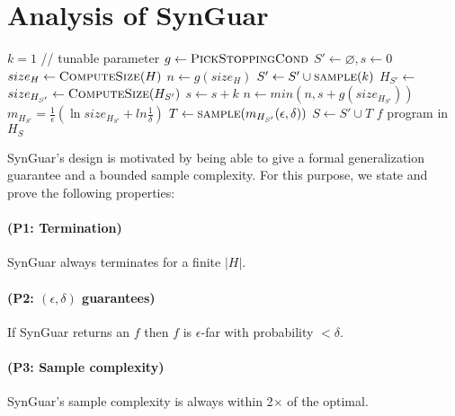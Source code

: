 \documentclass[11pt]{extarticle}
\newcommand{\tool}{{\sc SynGuar}\xspace}
\begin{document}
\section{Analysis of \tool}

\begin{algorithm}[t]
    \caption{\tool Synthesis returns a program with error smaller than $\epsilon$ with probability higher than $1-\delta$}
    \label{alg:main}
    \begin{algorithmic}[1]
      \Procedure{\tool}{$\epsilon, \delta$}
      \State $k = 1$ // tunable parameter
      \State $g \gets \Call{PickStoppingCond}{}$ \label{alg:pick-cond}
      \State $S' \gets \varnothing, s \gets 0$
      \State $size_{H} \gets \Call{ComputeSize}{H}$ \label{alg:call-compute} 
      \State $n \gets g(size_{H})$
      \State $S' \gets S' \cup \Call{sample}{k}$
      \State $H_{S'} \gets $  \label{alg:call-update}
      \State $size_{H_{S'}} \gets \Call{ComputeSize}{H_{S'}}$ \label{alg:call-compute}
      \State $s \gets s + k$
      \State $n \gets min(n, s+g(size_{H_{S'}}))$ \label{alg:min-thresh}
      \EndWhile
      \State $m_{H_{S'}}=\frac{1}{\epsilon}(\ln{size_{H_{S'}}} + ln{\frac{1}{\delta}})$
      \State $T \gets \Call{sample}{m_{H_{S'}}(\epsilon, \delta)}$
      \State $S \gets S'\cup T$ 
      \State \Return $f$ program in $H_S$
      \EndProcedure
    \end{algorithmic}
\end{algorithm}

\tool's design is motivated by being able to give a formal generalization guarantee and a bounded sample complexity. For this purpose, we state and prove the following properties: 

\paragraph{(P1: Termination)} \tool always terminates for a finite $|H|$.

\paragraph{(P2: $(\epsilon, \delta)$ guarantees)} If \tool returns an $f$ then $f$ is $\epsilon$-far with probability $<\delta$.

\paragraph{(P3: Sample complexity)} \tool's sample complexity is always within 2$\times$ of the optimal.
\end{document}
